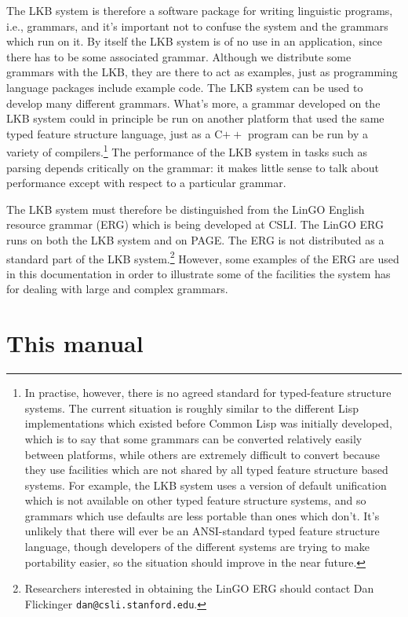 \documentclass[12pt]{report}
\begin{document}
The LKB system is therefore a software package for writing
linguistic programs, i.e., grammars, and it's
important not to confuse the system and the grammars which run on it. By
itself the LKB system is of no use in an application, since
there has to be some associated grammar.
Although we distribute some grammars with the LKB, they are there to act as
examples, just as programming language packages include example code.  
The LKB system can be used to develop many different grammars.
What's more,
a grammar developed on the LKB system could in principle
be run on another platform that used the same typed feature 
structure language, just as a C$++$ program can be run
by a variety of compilers.\footnote{In practise, however, there
is no agreed standard for typed-feature structure systems.
The current situation is roughly similar to the different Lisp implementations
which existed before Common Lisp was initially developed, which is
to say that some grammars can be converted relatively easily between
platforms, while others are extremely difficult to convert because 
they use facilities which are not shared by all typed feature structure
based systems.  For example, the LKB system uses a version of 
default unification
which is not available on other typed feature structure systems,
and so grammars which use defaults are less portable than ones which
don't.  It's unlikely that there will ever be an ANSI-standard
typed feature structure language, though developers of the different
systems are trying to make portability easier, so the situation should
improve in the near future.}  
The performance of the LKB system in tasks such
as parsing depends critically on the grammar: it makes little sense to 
talk about performance except with respect to a 
particular grammar.

The LKB system
must therefore be distinguished from the LinGO English resource grammar
(ERG) which is being developed at CSLI.  The LinGO ERG runs on 
both the LKB system and on PAGE.
The ERG is not distributed as a standard part
of the LKB system.\footnote{Researchers interested in obtaining the
LinGO ERG should contact Dan Flickinger {\tt dan@csli.stanford.edu}.}
However,
some examples of the ERG are used in this documentation in order
to illustrate some of the facilities the system has for dealing 
with large and complex grammars.

\section{This manual}
\end{document}
